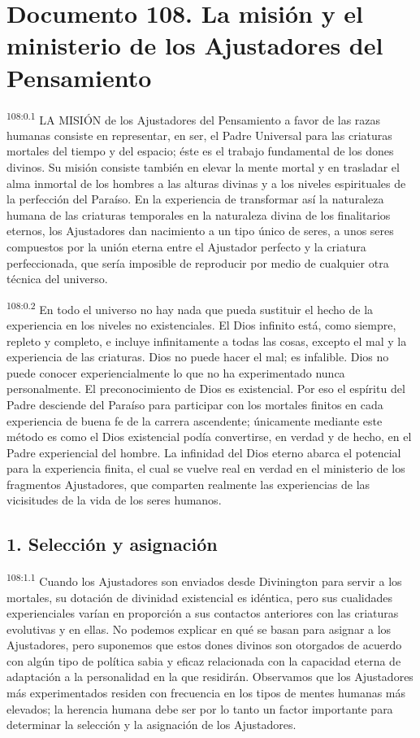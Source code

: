 \documentclass[twoside, 11pt]{book}
\begin{document}
\chapter{Documento 108. La misión y el ministerio de los Ajustadores del Pensamiento}
\par
\textsuperscript{108:0.1} LA MISIÓN de los Ajustadores del Pensamiento a favor de las razas humanas consiste en representar, en ser, el Padre Universal para las criaturas mortales del tiempo y del espacio; éste es el trabajo fundamental de los dones divinos. Su misión consiste también en elevar la mente mortal y en trasladar el alma inmortal de los hombres a las alturas divinas y a los niveles espirituales de la perfección del Paraíso. En la experiencia de transformar así la naturaleza humana de las criaturas temporales en la naturaleza divina de los finalitarios eternos, los Ajustadores dan nacimiento a un tipo único de seres, a unos seres compuestos por la unión eterna entre el Ajustador perfecto y la criatura perfeccionada, que sería imposible de reproducir por medio de cualquier otra técnica del universo.

\par
\textsuperscript{108:0.2} En todo el universo no hay nada que pueda sustituir el hecho de la experiencia en los niveles no existenciales. El Dios infinito está, como siempre, repleto y completo, e incluye infinitamente a todas las cosas, excepto el mal y la experiencia de las criaturas. Dios no puede hacer el mal; es infalible. Dios no puede conocer experiencialmente lo que no ha experimentado nunca personalmente. El preconocimiento de Dios es existencial. Por eso el espíritu del Padre desciende del Paraíso para participar con los mortales finitos en cada experiencia de buena fe de la carrera ascendente; únicamente mediante este método es como el Dios existencial podía convertirse, en verdad y de hecho, en el Padre experiencial del hombre. La infinidad del Dios eterno abarca el potencial para la experiencia finita, el cual se vuelve real en verdad en el ministerio de los fragmentos Ajustadores, que comparten realmente las experiencias de las vicisitudes de la vida de los seres humanos.

\section*{1. Selección y asignación}
\par
\textsuperscript{108:1.1} Cuando los Ajustadores son enviados desde Divinington para servir a los mortales, su dotación de divinidad existencial es idéntica, pero sus cualidades experienciales varían en proporción a sus contactos anteriores con las criaturas evolutivas y en ellas. No podemos explicar en qué se basan para asignar a los Ajustadores, pero suponemos que estos dones divinos son otorgados de acuerdo con algún tipo de política sabia y eficaz relacionada con la capacidad eterna de adaptación a la personalidad en la que residirán. Observamos que los Ajustadores más experimentados residen con frecuencia en los tipos de mentes humanas más elevados; la herencia humana debe ser por lo tanto un factor importante para determinar la selección y la asignación de los Ajustadores.
\end{document}
